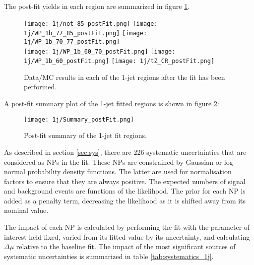 The post-fit yields in each region are summarized in figure \ref{fig:fit_regions_1j}.

\begin{figure}[H]
    \center
    \texttt{[image: 1j/not\_85\_postFit.png]}%
    \texttt{[image: 1j/WP\_1b\_77\_85\_postFit.png]}%
    \texttt{[image: 1j/WP\_1b\_70\_77\_postFit.png]}\\
    \texttt{[image: 1j/WP\_1b\_60\_70\_postFit.png]}%
    \texttt{[image: 1j/WP\_1b\_60\_postFit.png]}%
    \texttt{[image: 1j/tZ\_CR\_postFit.png]}\\
    \caption{Data/MC results in each of the 1-jet regions after the fit has been performed.}
    \label{fig:fit_regions_1j}
\end{figure}

A post-fit summary plot of the 1-jet fitted regions is shown in figure \ref{fig:fit_results_1j}: 

\begin{figure}[H]
    \center
    \texttt{[image: 1j/Summary\_postFit.png]}
    \caption{Post-fit summary of the 1-jet fit regions.}
    \label{fig:fit_results_1j}
\end{figure}

As described in section \ref{sec:sys}, there are 226 systematic uncertainties that are considered as NPs in the fit. These NPs are constrained by Gaussian or log-normal probability density functions. The latter are used for normalisation factors to ensure that they are always positive. The expected numbers
of signal and background events are functions of the likelihood. The prior for each NP is added as a penalty term, decreasing the likelihood as it is shifted away from its nominal value. 

The impact of each NP is calculated by performing the fit with the parameter of interest held fixed, varied from its fitted value by its uncertainty, and calculating $\Delta\mu$ relative to the baseline fit.  The impact of the most significant sources of systematic uncertainties is summarized in table \ref{tab:systematics_1j}. 

